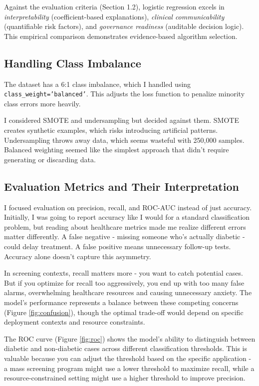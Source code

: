 \documentclass[12pt,a4paper]{article}
\begin{document}
Against the evaluation criteria (Section 1.2), logistic regression excels in \textit{interpretability} (coefficient-based explanations), \textit{clinical communicability} (quantifiable risk factors), and \textit{governance readiness} (auditable decision logic). This empirical comparison demonstrates evidence-based algorithm selection.

\subsection{Handling Class Imbalance}

The dataset has a 6:1 class imbalance, which I handled using \texttt{class\_weight='balanced'}. This adjusts the loss function to penalize minority class errors more heavily. 

I considered SMOTE and undersampling but decided against them. SMOTE creates synthetic examples, which risks introducing artificial patterns. Undersampling throws away data, which seems wasteful with 250,000 samples. Balanced weighting seemed like the simplest approach that didn't require generating or discarding data.

\subsection{Evaluation Metrics and Their Interpretation}

I focused evaluation on precision, recall, and ROC-AUC instead of just accuracy. Initially, I was going to report accuracy like I would for a standard classification problem, but reading about healthcare metrics made me realize different errors matter differently. A false negative - missing someone who's actually diabetic - could delay treatment. A false positive means unnecessary follow-up tests. Accuracy alone doesn't capture this asymmetry.

In screening contexts, recall matters more - you want to catch potential cases. But if you optimize for recall too aggressively, you end up with too many false alarms, overwhelming healthcare resources and causing unnecessary anxiety. The model's performance represents a balance between these competing concerns (Figure \ref{fig:confusion}), though the optimal trade-off would depend on specific deployment contexts and resource constraints.

The ROC curve (Figure \ref{fig:roc}) shows the model's ability to distinguish between diabetic and non-diabetic cases across different classification thresholds. This is valuable because you can adjust the threshold based on the specific application - a mass screening program might use a lower threshold to maximize recall, while a resource-constrained setting might use a higher threshold to improve precision.
\end{document}
